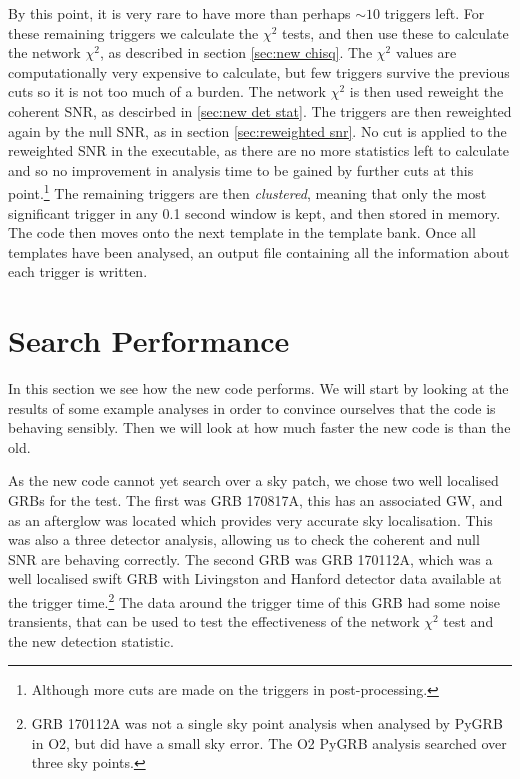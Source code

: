\documentclass[11pt]{cuthesis}
\begin{document}
By this point, it is very rare to have more than perhaps $\sim 10$ triggers left. For these remaining triggers we calculate the $\chi^2$ tests, and then use these to calculate the network $\chi^2$, as described in section \ref{sec:new chisq}. The $\chi^2$ values are computationally very expensive to calculate, but few triggers survive the previous cuts so it is not too much of a burden. The network $\chi^2$ is then used reweight the coherent SNR, as descirbed in \ref{sec:new det stat}. The triggers are then reweighted again by the null SNR, as in section \ref{sec:reweighted snr}. No cut is applied to the reweighted SNR in the executable, as there are no more statistics left to calculate and so no improvement in analysis time to be gained by further cuts at this point.\footnote{Although more cuts are made on the triggers in post-processing.} The remaining triggers are then \textit{clustered}, meaning that only the most significant trigger in any 0.1 second window is kept, and then stored in memory. The code then moves onto the next template in the template bank. Once all templates have been analysed, an output file containing all the information about each trigger is written.

\FloatBarrier
\section{Search Performance}
In this section we see how the new code performs. We will start by looking at the results of some example analyses in order to convince ourselves that the code is behaving sensibly. Then we will look at how much faster the new code is than the old. 

As the new code cannot yet search over a sky patch, we chose two well localised GRBs for the test. The first was GRB 170817A, this has an associated GW, and as an afterglow was located which provides very accurate sky localisation. This was also a three detector analysis, allowing us to check the coherent and null SNR are behaving correctly. The second GRB was GRB 170112A, which was a well localised swift GRB with Livingston and Hanford detector data available at the trigger time.\footnote{GRB 170112A was not a single sky point analysis when analysed by PyGRB in O2, but did have a small sky error. The O2 PyGRB analysis searched over three sky points.} The data around the trigger time of this GRB had some noise transients, that can be used to test the effectiveness of the network $\chi^2$ test and the new detection statistic.
\end{document}
